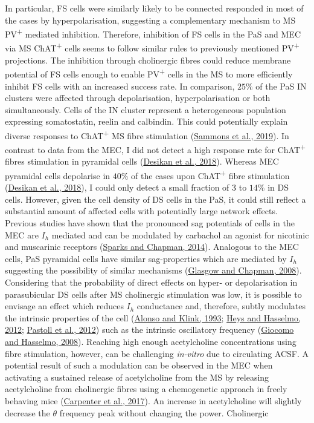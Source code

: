 \documentclass[
  12pt,
  a4paper,
  openany]{book}
\begin{document}
In particular, FS cells were similarly likely to be connected responded in most of the cases by hyperpolarisation, suggesting a complementary mechanism to MS PV\textsuperscript{+} mediated inhibition. Therefore, inhibition of FS cells in the PaS and MEC via MS ChAT\textsuperscript{+} cells seems to follow similar rules to previously mentioned PV\textsuperscript{+} projections. The inhibition through cholinergic fibres could reduce membrane potential of FS cells enough to enable PV\textsuperscript{+} cells in the MS to more efficiently inhibit FS cells with an increased success rate. In comparison, \(25\%\) of the PaS IN clusters were affected through depolarisation, hyperpolarisation or both simultaneously. Cells of the IN cluster represent a heterogeneous population expressing somatostatin, reelin and calbindin. This could potentially explain diverse responses to ChAT\textsuperscript{+} MS fibre stimulation (\protect\hyperlink{ref-sammons_electrophysiological_2019}{Sammons et al., 2019}). In contrast to data from the MEC, I did not detect a high response rate for ChAT\textsuperscript{+} fibres stimulation in pyramidal cells (\protect\hyperlink{ref-desikan_target_2018}{Desikan et al., 2018}). Whereas MEC pyramidal cells depolarise in \(40\%\) of the cases upon ChAT\textsuperscript{+} fibre stimulation (\protect\hyperlink{ref-desikan_target_2018}{Desikan et al., 2018}), I could only detect a small fraction of \(3\) to \(14\%\) in DS cells. However, given the cell density of DS cells in the PaS, it could still reflect a substantial amount of affected cells with potentially large network effects. Previous studies have shown that the pronounced sag potentials of cells in the MEC are \(I_{h}\) mediated and can be modulated by carbachol an agonist for nicotinic and muscarinic receptors (\protect\hyperlink{ref-sparks_contribution_2014}{Sparks and Chapman, 2014}). Analogous to the MEC cells, PaS pyramidal cells have similar sag-properties which are mediated by \(I_{h}\) suggesting the possibility of similar mechanisms (\protect\hyperlink{ref-glasgow_conductances_2008}{Glasgow and Chapman, 2008}). Considering that the probability of direct effects on hyper- or depolarisation in parasubicular DS cells after MS cholinergic stimulation was low, it is possible to envisage an effect which reduces \(I_{h}\) conductance and, therefore, subtly modulates the intrinsic properties of the cell (\protect\hyperlink{ref-alonso_differential_1993}{Alonso and Klink, 1993}; \protect\hyperlink{ref-heys_neuromodulation_2012}{Heys and Hasselmo, 2012}; \protect\hyperlink{ref-pastoll_intrinsic_2012}{Pastoll et al., 2012}) such as the intrinsic oscillatory frequency (\protect\hyperlink{ref-giocomo_time_2008}{Giocomo and Hasselmo, 2008}). Reaching high enough acetylcholine concentrations using fibre stimulation, however, can be challenging \emph{in-vitro} due to circulating ACSF. A potential result of such a modulation can be observed in the MEC when activating a sustained release of acetylcholine from the MS by releasing acetylcholine from cholinergic fibres using a chemogenetic approach in freely behaving mice (\protect\hyperlink{ref-carpenter_modulating_2017}{Carpenter et al., 2017}). An increase in acetylcholine will slightly decrease the \(\theta\) frequency peak without changing the power. Cholinergic 
\end{document}
